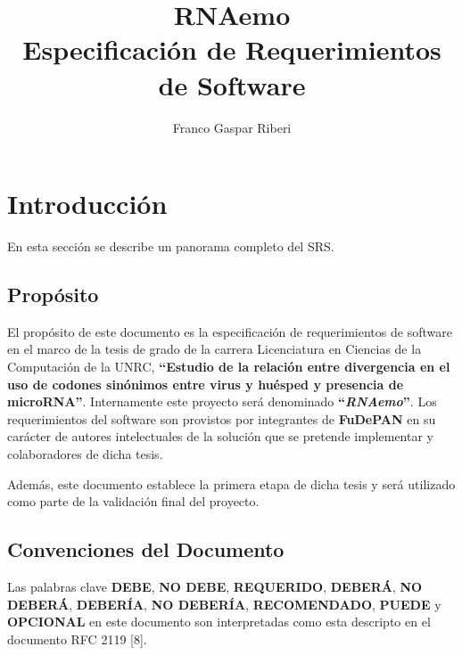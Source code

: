 \documentclass[12pt,a4paper,spanish]{article}
\title{\textbf{RNAemo}\\ \vspace{0.45cm} Especificación de Requerimientos de Software}
\author{Franco Gaspar Riberi}
\newcommand{\rnaemo}{\textbf{\emph{RNAemo}}}
\begin{document}
\maketitle\pagebreak{}\tableofcontents{}\pagebreak{}

\section{Introducción}
En esta sección se describe un panorama completo del SRS.

\subsection{Propósito}
\par El propósito de este documento es la especificación de requerimientos
de software en el marco de la tesis de grado de la carrera Licenciatura en
Ciencias de la Computación de la UNRC, \textbf{``Estudio de la relación entre divergencia en el uso de codones 
sinónimos entre virus y huésped y presencia de microRNA''}. Internamente este proyecto será denominado \textbf{``}\rnaemo\textbf{''}.
Los requerimientos del software son provistos por integrantes de \textbf{FuDePAN} en su carácter de autores
intelectuales de la solución que se pretende implementar y colaboradores
de dicha tesis.
\par Además, este documento establece la primera etapa de dicha tesis y será utilizado
como parte de la validación final del proyecto.

\subsection{Convenciones del Documento}
Las palabras clave \textbf{DEBE}, \textbf{NO DEBE}, \textbf{REQUERIDO}, \textbf{DEBERÁ}, \textbf{NO DEBERÁ},
 \textbf{DEBERÍA}, \textbf{NO DEBERÍA}, \textbf{RECOMENDADO}, \textbf{PUEDE} y \textbf{OPCIONAL}
en este documento son interpretadas como esta descripto en el documento RFC
2119 [8]. 
\end{document}
